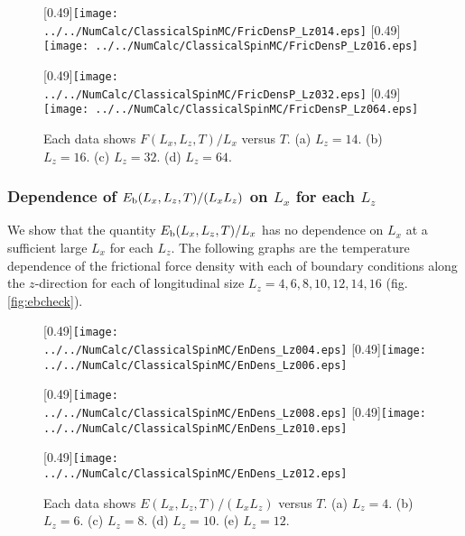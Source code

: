 \begin{figure}[htbp]
	\centering
	
	\subcaptionbox{\label{fig:ffdcheckfor014}}[0.49\linewidth]{\texttt{[image: ../../NumCalc/ClassicalSpinMC/FricDensP\_Lz014.eps]}}
	\subcaptionbox{\label{fig:ffdcheckfor016}}[0.49\linewidth]{\texttt{[image: ../../NumCalc/ClassicalSpinMC/FricDensP\_Lz016.eps]}}
	
	\subcaptionbox{\label{fig:ffdcheckfor032}}[0.49\linewidth]{\texttt{[image: ../../NumCalc/ClassicalSpinMC/FricDensP\_Lz032.eps]}}
	\subcaptionbox{\label{fig:ffdcheckfor064}}[0.49\linewidth]{\texttt{[image: ../../NumCalc/ClassicalSpinMC/FricDensP\_Lz064.eps]}}
	
	\caption{Each data shows $F(L_{x}, L_{z}, T)/L_{x}$ versus $T$. (a) $L_{z}=14$. (b) $L_{z}=16$. (c) $L_{z}=32$. (d) $L_{z}=64$.}
	\label{fig:ffdcheck2}
\end{figure}

\subsubsection{Dependence of $E_{\rm b}(L_{x}, L_{z}, T)/(L_{x}L_{z})$ on $L_{x}$ for each $L_{z}$}

We show that the quantity $E_{\rm b}(L_{x}, L_{z}, T)/L_{x}$ has no dependence on $L_{x}$ at a sufficient large $L_{x}$ for each $L_{z}$. The following graphs are the temperature dependence of the frictional force density with each of boundary conditions along the $z$-direction for each of longitudinal size $L_{z} = 4, 6, 8, 10, 12, 14, 16$ (fig.\ref{fig:ebcheck}).

\begin{figure}[htbp]
	\centering
	\subcaptionbox{\label{fig:ebcheckfor004}}[0.49\linewidth]{\texttt{[image: ../../NumCalc/ClassicalSpinMC/EnDens\_Lz004.eps]}}
	\subcaptionbox{\label{fig:ebcheckfor006}}[0.49\linewidth]{\texttt{[image: ../../NumCalc/ClassicalSpinMC/EnDens\_Lz006.eps]}}
	
	\subcaptionbox{\label{fig:ebcheckfor008}}[0.49\linewidth]{\texttt{[image: ../../NumCalc/ClassicalSpinMC/EnDens\_Lz008.eps]}}
	\subcaptionbox{\label{fig:ebcheckfor010}}[0.49\linewidth]{\texttt{[image: ../../NumCalc/ClassicalSpinMC/EnDens\_Lz010.eps]}}
	
	\subcaptionbox{\label{fig:ebcheckfor012}}[0.49\linewidth]{\texttt{[image: ../../NumCalc/ClassicalSpinMC/EnDens\_Lz012.eps]}}
	
	\caption{Each data shows $E(L_{x}, L_{z}, T)/(L_{x}L_{z})$ versus $T$. (a) $L_{z}=4$. (b) $L_{z}=6$. (c) $L_{z}=8$. (d) $L_{z}=10$. (e) $L_{z}=12$.}
	\label{fig:ebcheck1}
\end{figure}

